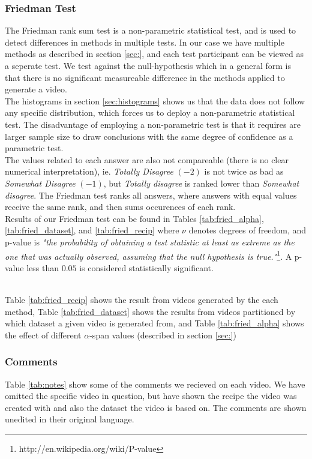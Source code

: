 \subsubsection{Friedman Test}
%
The Friedman rank sum test
 is a non-parametric statistical test, and is used to detect differences in methods in multiple tests. In our case we have multiple methods as described in section \ref{sec:}, and each test participant can be viewed as a seperate test. We test against the null-hypothesis which in a general form is that there is no significant measureable difference in the methods applied to generate a video.\\
%
The histograms in section \ref{sec:histograms} shows us that the data does not follow any specific distribution, which forces us to deploy a non-parametric statistical test. The disadvantage of employing a non-parametric test is that it requires are larger sample size to draw conclusions with the same degree of confidence as a parametric test.\\
%
The values related to each answer are also not compareable (there is no clear numerical interpretation), ie. \textit{Totally Disagree} $(-2)$ is not twice as bad as \textit{Somewhat Disagree} $(-1)$, but \textit{Totally disagree} is ranked lower than \textit{Somewhat disagree}. The Friedman test ranks all answers, where answers with equal values receive the same rank, and then sums occurences of each rank.\\
%
Results of our Friedman test can be found in Tables \ref{tab:fried_alpha}, \ref{tab:fried_dataset}, and \ref{tab:fried_recip} where $\nu$ denotes degrees of freedom, and p-value is \textit{"the probability of obtaining a test statistic at least as extreme as the one that was actually observed, assuming that the null hypothesis is true."}\footnote{http://en.wikipedia.org/wiki/P-value}. A p-value less than $0.05$ is considered statistically significant.



%
\\ %
Table \ref{tab:fried_recip} shows the result from videos generated by the each method, Table \ref{tab:fried_dataset} shows the results from videos partitioned by which dataset a given video is generated from, and Table \ref{tab:fried_alpha} shows the effect of different $\alpha$-span values (described in section \ref{sec:})
%
\subsubsection{Comments}\label{sec:comments}
%
Table \ref{tab:notes} show some of the comments we recieved on each video. We have omitted the specific video in question, but have shown the recipe the video was created with and also the dataset the video is based on. The comments are shown unedited in their original language.
%

%
